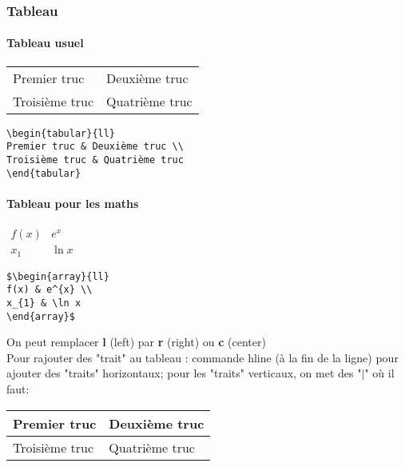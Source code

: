 \documentclass[12pt,french,oneside]{report}
\begin{document}
\begin{spacing}{1.2}
\subsubsection{Tableau}

\paragraph{Tableau usuel}

\begin{center}
\begin{tabular}{ll}
Premier truc & Deuxième truc \\
Troisième truc & Quatrième truc
\end{tabular}
\end{center}

\begin{verbatim}
\begin{tabular}{ll}
Premier truc & Deuxième truc \\
Troisième truc & Quatrième truc
\end{tabular}
\end{verbatim}

\paragraph{Tableau pour les maths} 

\begin{center}
$
\begin{array}{ll}
f(x) & e^{x} \\
x_{1} & \ln x
\end{array}
$
\end{center}

\begin{verbatim}
$\begin{array}{ll}
f(x) & e^{x} \\
x_{1} & \ln x
\end{array}$
\end{verbatim}

On peut remplacer \textbf{l} (left) par \textbf{r} (right) ou \textbf{c} (center)\\
Pour rajouter des "trait" au tableau : commande hline (à la fin de la ligne) pour ajouter des "traits" horizontaux; pour les "traits" verticaux, on met des "$\vert$" où il faut:\\ 

\begin{center}
\begin{tabular}{|l|l|}
\hline
Premier truc & Deuxième truc\\ 
\hline
Troisième truc & Quatrième truc\\ 
\hline
\end{tabular}
\end{center}


\end{spacing}
\end{document}
